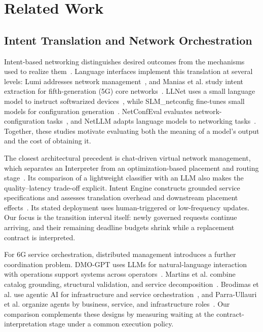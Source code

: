\section{Related Work}
\subsection{Intent Translation and Network Orchestration}
Intent-based networking distinguishes desired outcomes from the mechanisms used to realize them~\cite{clemm2022intentbased}. Language interfaces implement this translation at several levels: Lumi addresses network management~\cite{jacobs2021hey}, and Manias et al. study intent extraction for fifth-generation (5G) core networks~\cite{manias2024intentbased}. LLNet uses a small language model to instruct softwarized devices~\cite{angi2025llnet}, while SLM\_netconfig fine-tunes small models for configuration generation~\cite{lira2025network}. NetConfEval evaluates network-configuration tasks~\cite{wang2024netconfeval}, and NetLLM adapts language models to networking tasks~\cite{wu2024netllm}. Together, these studies motivate evaluating both the meaning of a model's output and the cost of obtaining it.

The closest architectural precedent is chat-driven virtual network management, which separates an Interpreter from an optimization-based placement and routing stage~\cite{miyaoka2025chatdriven}. Its comparison of a lightweight classifier with an LLM also makes the quality--latency trade-off explicit. Intent Engine constructs grounded service specifications and assesses translation overhead and downstream placement effects~\cite{islam2026intentpreprint}. Its stated deployment uses human-triggered or low-frequency updates. Our focus is the transition interval itself: newly governed requests continue arriving, and their remaining deadline budgets shrink while a replacement contract is interpreted.

For 6G service orchestration, distributed management introduces a further coordination problem. DMO-GPT uses LLMs for natural-language interaction with operations support systems across operators~\cite{mekrache2026dmogpt}. Martins et al. combine catalog grounding, structural validation, and service decomposition~\cite{martins2026intentdriven}. Brodimas et al. use agentic AI for infrastructure and service orchestration~\cite{brodimas2025intentbased}, and Parra-Ullauri et al. organize agents by business, service, and infrastructure roles~\cite{parra-ullauri2026rolebased}. Our comparison complements these designs by measuring waiting at the contract-interpretation stage under a common execution policy.

